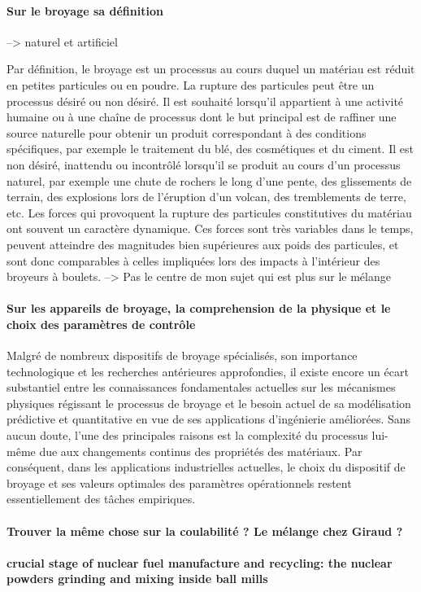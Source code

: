 \paragraph{Sur le broyage sa définition} --> naturel et artificiel

Par définition, le broyage est un processus au cours duquel un matériau est réduit en petites particules ou en poudre. La rupture des particules peut être un processus désiré ou non désiré. Il est souhaité lorsqu'il appartient à une activité humaine ou à une chaîne de processus dont le but principal est de raffiner une source naturelle pour obtenir un produit correspondant à des conditions spécifiques, par exemple le traitement du blé, des cosmétiques et du ciment. Il est non désiré, inattendu ou incontrôlé lorsqu'il se produit au cours d'un processus naturel, par exemple une chute de rochers le long d'une pente, des glissements de terrain, des explosions lors de l'éruption d'un volcan, des tremblements de terre, etc. Les forces qui provoquent la rupture des particules constitutives du matériau ont souvent un caractère dynamique. Ces forces sont très variables dans le temps, peuvent atteindre des magnitudes bien supérieures aux poids des particules, et sont donc comparables à celles impliquées lors des impacts à l'intérieur des broyeurs à boulets. --> Pas le centre de mon sujet qui est plus sur le mélange

\paragraph{Sur les appareils de broyage, la comprehension de la physique et le choix des paramètres de contrôle}

Malgré de nombreux dispositifs de broyage spécialisés, son importance technologique et les recherches antérieures approfondies, il existe encore un écart substantiel entre les connaissances fondamentales actuelles sur les mécanismes physiques régissant le processus de broyage et le besoin actuel de sa modélisation prédictive et quantitative en vue de ses applications d'ingénierie améliorées. Sans aucun doute, l'une des principales raisons est la complexité du processus lui-même due aux changements continus des propriétés des matériaux. Par conséquent, dans les applications industrielles actuelles, le choix du dispositif de broyage et ses valeurs optimales des paramètres opérationnels restent essentiellement des tâches empiriques.

\paragraph{Trouver la même chose sur la coulabilité ? Le mélange chez Giraud ?}

\paragraph{crucial stage of nuclear fuel manufacture and recycling: the nuclear powders grinding and mixing inside ball mills}




